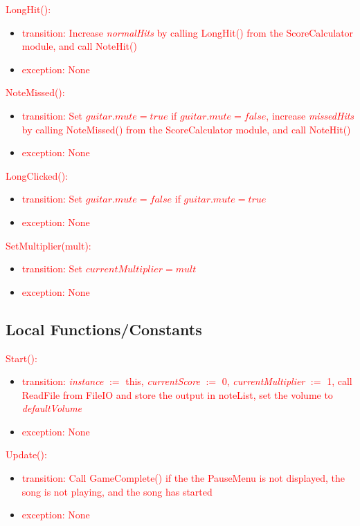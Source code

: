 \documentclass[12pt]{article}
\begin{document}
\noindent \textcolor{red}{LongHit():}
\begin{itemize}
    \item \textcolor{red}{transition: Increase \textit{normalHits} by calling LongHit() from the ScoreCalculator module, and call NoteHit()}
    \item \textcolor{red}{exception: None}
\end{itemize}

\noindent \textcolor{red}{NoteMissed():}
\begin{itemize}
    \item \textcolor{red}{transition: Set $guitar.mute = true$ if $guitar.mute = false$, increase \textit{missedHits} by calling NoteMissed() from the ScoreCalculator module, and call NoteHit()}
    \item \textcolor{red}{exception: None}
\end{itemize}

\noindent \textcolor{red}{LongClicked():}
\begin{itemize}
    \item \textcolor{red}{transition: Set $guitar.mute = false$ if $guitar.mute = true$}
    \item \textcolor{red}{exception: None}
\end{itemize}

\noindent \textcolor{red}{SetMultiplier(mult):}
\begin{itemize}
    \item \textcolor{red}{transition: Set $currentMultiplier = mult$}
    \item \textcolor{red}{exception: None}
\end{itemize}

\subsection{Local Functions/Constants}
\noindent \textcolor{red}{Start():}
\begin{itemize}
	\item \textcolor{red}{transition: \textit{instance} $:=$ this, \textit{currentScore} $:=$ 0, \textit{currentMultiplier} $:=$ 1, call ReadFile from FileIO and store the output in noteList, set the volume to \textit{defaultVolume}}
	\item \textcolor{red}{exception: None}
\end{itemize}

\noindent \textcolor{red}{Update():}
\begin{itemize}
	\item \textcolor{red}{transition: Call GameComplete() if the the PauseMenu is not displayed, the song is not playing, and the song has started}
	\item \textcolor{red}{exception: None}
\end{itemize}
\end{document}
